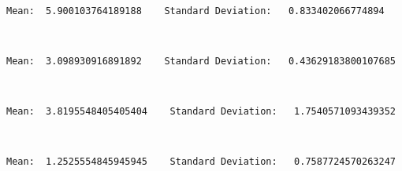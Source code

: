 \documentclass[11pt]{article}
\begin{document}
    \begin{center}
    \end{center}
    { \hspace*{\fill} \\}
    
    \begin{Verbatim}[commandchars=\\\{\}]
Mean:  5.900103764189188    Standard Deviation:   0.833402066774894

    \end{Verbatim}

    \begin{center}
    \end{center}
    { \hspace*{\fill} \\}
    
    \begin{Verbatim}[commandchars=\\\{\}]
Mean:  3.098930916891892    Standard Deviation:   0.43629183800107685

    \end{Verbatim}

    \begin{center}
    \end{center}
    { \hspace*{\fill} \\}
    
    \begin{Verbatim}[commandchars=\\\{\}]
Mean:  3.8195548405405404    Standard Deviation:   1.7540571093439352

    \end{Verbatim}

    \begin{center}
    \end{center}
    { \hspace*{\fill} \\}
    
    \begin{Verbatim}[commandchars=\\\{\}]
Mean:  1.2525554845945945    Standard Deviation:   0.7587724570263247

    \end{Verbatim}
\end{document}
